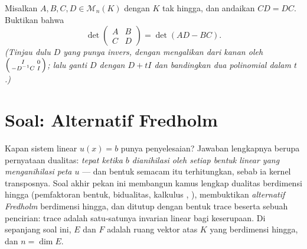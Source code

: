 \begin{exercise}[$\star\star\star$]\label{exo:b2:linalg:12}
Misalkan $A, B, C, D \in \mathcal{M}_n(K)$ dengan $K$ tak hingga, dan
andaikan $CD = DC$. Buktikan bahwa
\[
\det\begin{pmatrix} A & B\\ C & D\end{pmatrix}
= \det(AD - BC).
\]
\emph{(Tinjau dulu $D$ yang punya invers, dengan mengalikan dari kanan
oleh $\begin{psmallmatrix} I & 0\\ -D^{-1}C & I\end{psmallmatrix}$;
lalu ganti $D$ dengan $D + tI$ dan bandingkan dua polinomial dalam $t$.)}
\end{exercise}

\section{Soal: Alternatif Fredholm}

Kapan sistem linear $u(x) = b$ punya penyelesaian? Jawaban
lengkapnya berupa pernyataan dualitas: \emph{tepat ketika $b$
dianihilasi oleh setiap bentuk linear yang menganihilasi peta
$u$} --- dan bentuk semacam itu terhitungkan, sebab ia kernel
transposnya. Soal akhir pekan ini membangun kamus lengkap
dualitas berdimensi hingga (pemfaktoran bentuk, bidualitas,
kalkulus , ), membuktikan \emph{alternatif
Fredholm} berdimensi hingga, dan ditutup dengan
bentuk trace beserta sebuah pencirian: trace adalah satu-satunya
invarian linear bagi keserupaan. Di sepanjang soal ini, $E$ dan $F$
adalah ruang vektor atas $K$ yang berdimensi hingga, dan $n = \dim E$.

